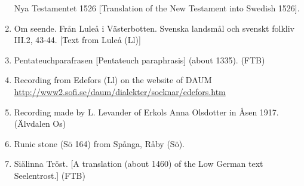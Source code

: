 \begin{enumerate}
\label{bkm:Ref137881523}Nya Testamentet 1526 [Translation of the New Testament into Swedish 1526].


\item[\sqbrSenum]

\label{bkm:Ref159658122}Om seende. Från Luleå i Västerbotten. Svenska landsmål och svenskt folkliv III.2, 43-44. [Text from Luleå (Ll)]

\item[\sqbrSenum]

\label{bkm:Ref137881441}Pentateuchparafrasen [Pentateuch paraphrasis] (about 1335). (FTB)


\item[\sqbrSenum]

\label{bkm:Ref154213836}Recording from Edefors (Ll) on the website of DAUM\\
\url{http://www2.sofi.se/daum/dialekter/socknar/edefors.htm}

\item[\sqbrSenum]

\label{bkm:Ref154557175}Recording made by L. Levander of Erkols Anna Olsdotter in Åsen 1917. (Älvdalen Os)

\item[\sqbrSenum]

\label{bkm:Ref154220979}Runic stone (Sö 164) from Spånga, Råby (Sö).


\item[\sqbrSenum]

\label{bkm:Ref137881417}Siälinna Tröst. [A translation (about 1460) of the Low German text Seelentrost.] (FTB)



\end{enumerate}
